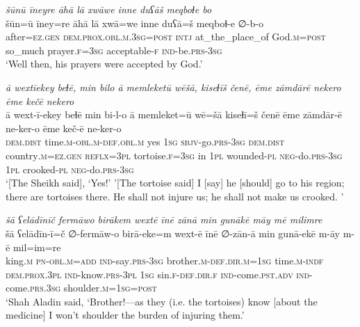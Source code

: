\ea \label{DG.60}
\textit{šūnū īneyre āhā lā xwāwe inne duʕāš meqboɫe bo} \\ 
\gll šūn=ū īney=re āhā lā xwā=we inne duʕā=š meqboɫ-e ∅-b-o \\ 
 after\textsc{=ez}\textsc{.gen} \textsc{dem.prox}\textsc{.obl}\textsc{.m}\textsc{.3sg}\textsc{=\textsc{post}} \textsc{intj} at\_the\_place\_of God\textsc{.m}\textsc{=\textsc{post}} so\_much prayer\textsc{\textsc{.f}}\textsc{=3sg} acceptable\textsc{-f} \textsc{ind-}be\textsc{.prs}\textsc{-3sg} \\ 
\glt `Well then, his prayers were accepted by God.'
\z 
 
\ea \label{DG.64}
\textit{ā wextīekey beɫē, min bilo ā memleketū wēšā, kiseɫīš čenē, ēme zāmdārē nekero ēme kečē nekero} \\ 
\gll ā wext-ī-ekey beɫē min bi-l-o ā memleket=ū wē=šā kiseɫī=š čenē ēme zāmdār-ē ne-ker-o ēme keč-ē ne-ker-o \\ 
 \textsc{dem.dist} time\textsc{.m}\textsc{-obl}\textsc{.m}\textsc{-def}\textsc{.obl}\textsc{.m} yes \textsc{1sg} \textsc{sbjv-}go\textsc{.prs}\textsc{-3sg} \textsc{dem.dist} country\textsc{.m}\textsc{=ez}\textsc{.gen} \textsc{reflx}\textsc{=3pl} tortoise\textsc{\textsc{.f}}\textsc{=3sg} in \textsc{1pl} wounded\textsc{\textsc{-pl}} \textsc{neg-}do\textsc{.prs}\textsc{-3sg} \textsc{1pl} crooked\textsc{\textsc{-pl}} \textsc{neg-}do\textsc{.prs}\textsc{-3sg} \\ 
\glt `[The Sheikh said], ‘Yes!' '[The tortoise said] I [say] he [should] go to his region; there are tortoises there. He shall not injure us; he shall not make us crooked. '
\z 
 
\ea \label{DG.67}
\textit{šā ʕelādīnīč fermāwo birākem wextē īnē zānā min gunākē māy mē milimre} \\ 
\gll šā ʕelādīn-ī=č ∅-fermāw-o birā-eke=m wext-ē īnē ∅-zān-ā min gunā-ekē m-āy m-ē mil=im=re \\ 
 king\textsc{.m} \textsc{pn}\textsc{-obl}\textsc{.m}\textsc{=add} \textsc{ind-}say\textsc{.prs}\textsc{-3sg} brother\textsc{.m}\textsc{-def}\textsc{.dir}\textsc{.m}\textsc{=1sg} time\textsc{.m}\textsc{-indf} \textsc{dem.prox}\textsc{.3pl} \textsc{ind-}know\textsc{.prs}\textsc{-3pl} \textsc{1sg} sin\textsc{\textsc{.f}}\textsc{-def}\textsc{.dir}\textsc{\textsc{.f}} \textsc{ind-}come\textsc{.pst}\textsc{.adv} \textsc{ind-}come\textsc{.prs}\textsc{.3sg} shoulder\textsc{.m}\textsc{=1sg}\textsc{=\textsc{post}} \\ 
\glt `Shah Aladin said, ‘Brother!—as they (i.e. the tortoises) know [about the medicine] I won’t shoulder the burden of injuring them.'
\z 
 
